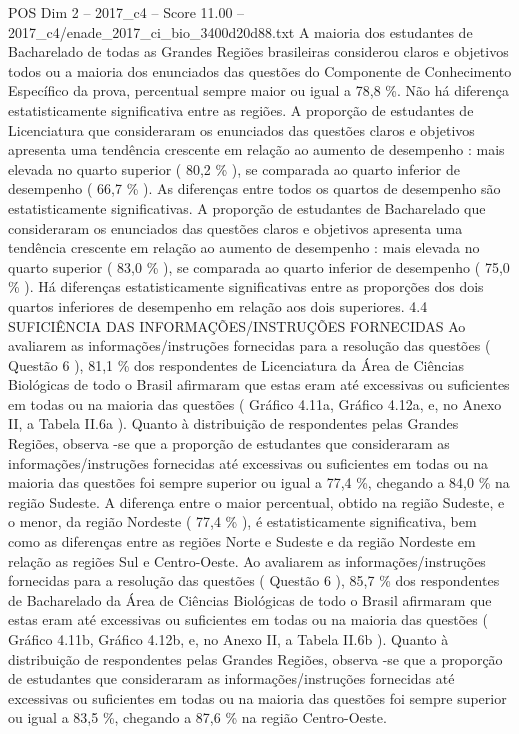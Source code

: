 \begin{textsample}{POS Dim 2 – 2017\_c4 – Score 11.00 – 2017\_c4/enade\_2017\_ci\_bio\_3400d20d88.txt}
A maioria dos estudantes de Bacharelado de todas as Grandes Regiões brasileiras considerou claros e objetivos todos ou a maioria dos enunciados das questões do Componente de Conhecimento Específico da prova, percentual sempre maior ou igual a 78,8 \%.
Não há diferença estatisticamente significativa entre as regiões.
A proporção de estudantes de Licenciatura que consideraram os enunciados das questões claros e objetivos apresenta uma tendência crescente em relação ao aumento de desempenho : mais elevada no quarto superior ( 80,2 \% ), se comparada ao quarto inferior de desempenho ( 66,7 \% ).
As diferenças entre todos os quartos de desempenho são estatisticamente significativas.
A proporção de estudantes de Bacharelado que consideraram os enunciados das questões claros e objetivos apresenta uma tendência crescente em relação ao aumento de desempenho : mais elevada no quarto superior ( 83,0 \% ), se comparada ao quarto inferior de desempenho ( 75,0 \% ).
Há diferenças estatisticamente significativas entre as proporções dos dois quartos inferiores de desempenho em relação aos dois superiores. 4.4 SUFICIÊNCIA DAS INFORMAÇÕES/INSTRUÇÕES FORNECIDAS Ao avaliarem as informações/instruções fornecidas para a resolução das questões ( Questão 6 ), 81,1 \% dos respondentes de Licenciatura da Área de Ciências Biológicas de todo o Brasil afirmaram que estas eram até excessivas ou suficientes em todas ou na maioria das questões ( Gráfico 4.11a, Gráfico 4.12a, e, no Anexo II, a Tabela II.6a ).
Quanto à distribuição de respondentes pelas Grandes Regiões, observa -se que a proporção de estudantes que consideraram as informações/instruções fornecidas até excessivas ou suficientes em todas ou na maioria das questões foi sempre superior ou igual a 77,4 \%, chegando a 84,0 \% na região Sudeste.
A diferença entre o maior percentual, obtido na região Sudeste, e o menor, da região Nordeste ( 77,4 \% ), é estatisticamente significativa, bem como as diferenças entre as regiões Norte e Sudeste e da região Nordeste em relação as regiões Sul e Centro-Oeste.
Ao avaliarem as informações/instruções fornecidas para a resolução das questões ( Questão 6 ), 85,7 \% dos respondentes de Bacharelado da Área de Ciências Biológicas de todo o Brasil afirmaram que estas eram até excessivas ou suficientes em todas ou na maioria das questões ( Gráfico 4.11b, Gráfico 4.12b, e, no Anexo II, a Tabela II.6b ).
Quanto à distribuição de respondentes pelas Grandes Regiões, observa -se que a proporção de estudantes que consideraram as informações/instruções fornecidas até excessivas ou suficientes em todas ou na maioria das questões foi sempre superior ou igual a 83,5 \%, chegando a 87,6 \% na região Centro-Oeste.

\end{textsample}
